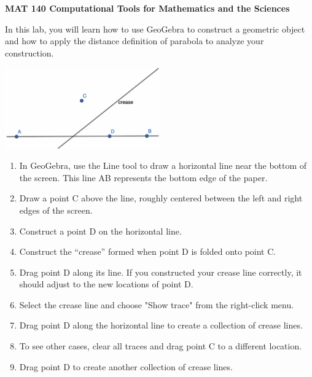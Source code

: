 \documentclass[11pt]{article}
\begin{document}
\begin{center}
{\bf MAT 140 \quad Computational Tools for Mathematics and the Sciences}

\end{center}

\medskip
{}

\smallskip


\smallskip




\vspace{0.2 in}



\smallskip

\noindent In this lab, you will learn how to use GeoGebra to construct a geometric object and how to apply the distance definition of parabola to analyze your construction.


\vspace{0.2 in}





\begin{center}
\includegraphics[width=0.5\textwidth]{figure1.png}
\end{center}

\begin{enumerate}[(1)]
\item In GeoGebra, use the Line tool to draw a horizontal line near the bottom of the screen. This line AB represents the bottom edge of the paper.
\item Draw a point C above the line, roughly centered between the left and right edges of the screen.	 	
\item Construct a point D on the horizontal line.
\item Construct the “crease” formed when point D is folded onto point C.
\item Drag point D along its line. If you constructed your crease line correctly, it should adjust to the new locations of point D.
\item Select the crease line and choose "Show trace" from the right-click menu.
\item Drag point D along the horizontal line to create a collection of crease lines.
\item To see other cases, clear all traces and drag point C to a different location.
\item Drag point D to create another collection of crease lines.
\end{enumerate}
\end{document}
